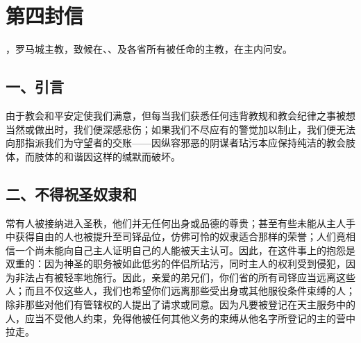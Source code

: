 

\section{第四封信}

，罗马城主教，致候在、、及各省所有被任命的主教，在主内问安。\par


\subsection{一、引言}

由于教会和平安定使我们满意，但每当我们获悉任何违背教规和教会纪律之事被想当然或做出时，我们便深感悲伤；如果我们不尽应有的警觉加以制止，我们便无法向那指派我们为守望者的交账——因纵容邪恶的阴谋者玷污本应保持纯洁的教会肢体，而肢体的和谐因这样的缄默而破坏。\par


\subsection{二、不得祝圣奴隶和}

常有人被接纳进入圣秩，他们并无任何出身或品德的尊贵；甚至有些未能从主人手中获得自由的人也被提升至司铎品位，仿佛可怜的奴隶适合那样的荣誉；人们竟相信一个尚未能向自己主人证明自己的人能被天主认可。因此，在这件事上的抱怨是双重的：因为神圣的职务被如此低劣的伴侣所玷污，同时主人的权利受到侵犯，因为非法占有被轻率地施行。因此，亲爱的弟兄们，你们省的所有司铎应当远离这些人；而且不仅这些人，我们也希望你们远离那些受出身或其他服役条件束缚的人；除非那些对他们有管辖权的人提出了请求或同意。因为凡要被登记在天主服务中的人，应当不受他人约束，免得他被任何其他义务的束缚从他名字所登记的主的营中拉走。\par


